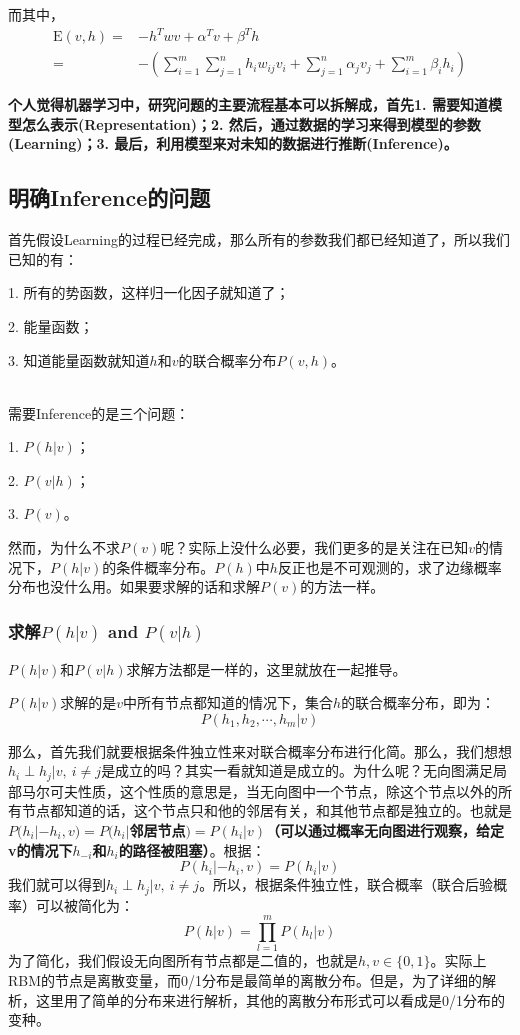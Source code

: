 \documentclass[a4paper]{article}
\begin{document}
而其中，
\begin{equation}
\begin{split}
    \mathrm{E}(v,h) = & - h^T w v + \alpha^T v + \beta^T h \\
    = & - \left( \sum_{i=1}^m \sum_{j=1}^n h_iw_{ij}v_i + \sum_{j=1}^n \alpha_j v_j + \sum_{i=1}^m \beta_i h_i 
    \right)
\end{split}
\end{equation}

\textbf{个人觉得机器学习中，研究问题的主要流程基本可以拆解成，首先1. 需要知道模型怎么表示(Representation)；2. 然后，通过数据的学习来得到模型的参数(Learning)；3. 最后，利用模型来对未知的数据进行推断(Inference)。}

\subsection{明确Inference的问题}
\noindent 首先假设Learning的过程已经完成，那么所有的参数我们都已经知道了，所以我们已知的有：
{\color{red}

1. 所有的势函数，这样归一化因子就知道了；

2. 能量函数；

3. 知道能量函数就知道$h$和$v$的联合概率分布$P(v,h)$。
}

~\\

\noindent 需要Inference的是三个问题：

1. $P(h|v)$；

2. $P(v|h)$；

3. $P(v)$。

然而，为什么不求$P(v)$呢？实际上没什么必要，我们更多的是关注在已知$v$的情况下，$P(h|v)$的条件概率分布。$P(h)$中$h$反正也是不可观测的，求了边缘概率分布也没什么用。如果要求解的话和求解$P(v)$的方法一样。

\subsubsection{求解$P(h|v)$ and $P(v|h)$}
$P(h|v)$和$P(v|h)$求解方法都是一样的，这里就放在一起推导。

$P(h|v)$求解的是$v$中所有节点都知道的情况下，集合$h$的联合概率分布，即为：
$$
P(h_1,h_2,\cdots,h_m|v)
$$

那么，首先我们就要根据条件独立性来对联合概率分布进行化简。那么，我们想想$h_i\perp h_j|v,\ i\neq j$是成立的吗？其实一看就知道是成立的。为什么呢？无向图满足局部马尔可夫性质，这个性质的意思是，当无向图中一个节点，除这个节点以外的所有节点都知道的话，这个节点只和他的邻居有关，和其他节点都是独立的。也就是\textbf{{\color{red}$P(h_i|-h_i,v) = P(h_i|$邻居节点$)=P(h_i|v)$（可以通过概率无向图进行观察，给定v的情况下$h_{-i}$和$h_i$的路径被阻塞）}}。根据：
$$
P(h_i|-h_i,v) =P(h_i|v)
$$
我们就可以得到$h_i\perp h_j|v,\ i\neq j$。所以，根据条件独立性，联合概率（联合后验概率）可以被简化为：
\begin{equation}
    P(h|v) = \prod_{l=1}^m P(h_l|v)
\end{equation}
为了简化，我们假设无向图所有节点都是二值的，也就是$h,v\in \{0,1 \}$。实际上RBM的节点是离散变量，而0/1分布是最简单的离散分布。但是，为了详细的解析，这里用了简单的分布来进行解析，其他的离散分布形式可以看成是0/1分布的变种。
\end{document}
